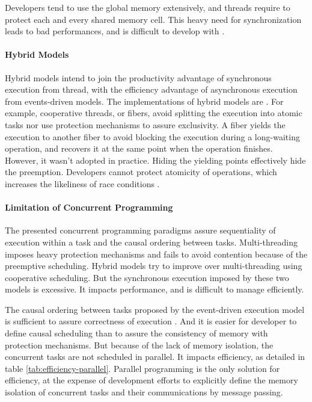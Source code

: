 Developers tend to use the global memory extensively, and threads require to protect each and every shared memory cell.
This heavy need for synchronization leads to bad performances, and is difficult to develop with \cite{Adya2002}.

\paragraph{Hybrid Models}

Hybrid models intend to join the productivity advantage of synchronous execution from thread, with the efficiency advantage of asynchronous execution from events-driven models.
The implementations of hybrid models are .
For example, cooperative threads, or fibers, avoid splitting the execution into atomic tasks nor use protection mechanisms to assure exclusivity.
A fiber yields the execution to another fiber to avoid blocking the execution during a long-waiting operation, and recovers it at the same point when the operation finishes.
However, it wasn't adopted in practice.
Hiding the yielding points effectively hide the preemption.
Developers cannot protect atomicity of operations, which increases the likeliness of race conditions .

\paragraph{Limitation of Concurrent Programming}

The presented concurrent programming paradigms assure sequentiality of execution within a task and the causal ordering between tasks.
Multi-threading imposes heavy protection mechanisms and fails to avoid contention because of the preemptive scheduling.
Hybrid models try to improve over multi-threading using cooperative scheduling.
But the synchronous execution imposed by these two models is excessive.
It impacts performance, and is difficult to manage efficiently.

The causal ordering between tasks proposed by the event-driven execution model is sufficient to assure correctness of execution \cite{Lamport1978,Reed2012}.
And it is easier for developer to define causal scheduling than to assure the consistency of memory with protection mechanisms.
But because of the lack of memory isolation, the concurrent tasks are not scheduled in parallel.
It impacts efficiency, as detailed in table \ref{tab:efficiency-parallel}.
Parallel programming is the only solution for efficiency, at the expense of development efforts to explicitly define the memory isolation of concurrent tasks and their communications by message passing.

